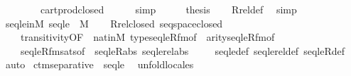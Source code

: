 \begin{isabellebody}
\ \ \ \ \ \ \ \ cartprod{\isacharunderscore}{\kern0pt}closed\isanewline
\ \ \ \ \isamarkupfalse%
\ simp\isanewline
\ \ \isamarkupfalse%
\ \isamarkupfalse%
\ {\isacharquery}{\kern0pt}thesis\isanewline
\ \ \isamarkupfalse%
\ Rrel{\isacharunderscore}{\kern0pt}def\ \isamarkupfalse%
\ simp\isanewline
{}\isamarkupfalse%
%
\endisatagproof
{\isafoldproof}%
%
\isadelimproof
\isanewline
%
\endisadelimproof
\isanewline
{}\isamarkupfalse%
\ seqle{\isacharunderscore}{\kern0pt}in{\isacharunderscore}{\kern0pt}M{\isacharcolon}{\kern0pt}\ {\isachardoublequoteopen}seqle\ {\isasymin}\ M{\isachardoublequoteclose}\isanewline
%
\isadelimproof
\ \ %
\endisadelimproof
%
\isatagproof
{}\isamarkupfalse%
\ Rrel{\isacharunderscore}{\kern0pt}closed\ seqspace{\isacharunderscore}{\kern0pt}closed\ \isanewline
\ \ \ \ transitivity{\isacharbrackleft}{\kern0pt}OF\ {\isacharunderscore}{\kern0pt}\ nat{\isacharunderscore}{\kern0pt}in{\isacharunderscore}{\kern0pt}M{\isacharbrackright}{\kern0pt}\ type{\isacharunderscore}{\kern0pt}seqleR{\isacharunderscore}{\kern0pt}fm{\isacharbrackleft}{\kern0pt}of\ {}{\isacharbrackright}{\kern0pt}\ arity{\isacharunderscore}{\kern0pt}seqleR{\isacharunderscore}{\kern0pt}fm{\isacharbrackleft}{\kern0pt}of\ {}{\isacharbrackright}{\kern0pt}\isanewline
\ \ \ \ seqleR{\isacharunderscore}{\kern0pt}fm{\isacharunderscore}{\kern0pt}sats{\isacharbrackleft}{\kern0pt}of\ {}{\isacharbrackright}{\kern0pt}\ seqleR{\isacharunderscore}{\kern0pt}abs\ seqlerel{\isacharunderscore}{\kern0pt}abs\ \isanewline
\ \ \isamarkupfalse%
\ seqle{\isacharunderscore}{\kern0pt}def\ seqlerel{\isacharunderscore}{\kern0pt}def\ seqleR{\isacharunderscore}{\kern0pt}def\isanewline
\ \ \isamarkupfalse%
\ auto%
\endisatagproof
{\isafoldproof}%
%
\isadelimproof
%
\endisadelimproof
%
\isadelimdocument
%
\endisadelimdocument
%
\isatagdocument
%
\isamarkuptrue%
%
\endisatagdocument
{\isafolddocument}%
%
\isadelimdocument
%
\endisadelimdocument
{}\isamarkupfalse%
\ ctm{\isacharunderscore}{\kern0pt}separative\ {\isachardoublequoteopen}{}{\isacharcircum}{\kern0pt}{\isacharless}{\kern0pt}{\isasymomega}{\isachardoublequoteclose}\ seqle\ {}\isanewline
%
\isadelimproof
%
\endisadelimproof
%
\isatagproof
{}\isamarkupfalse%
\ {\isacharparenleft}{\kern0pt}unfold{\isacharunderscore}{\kern0pt}locales{\isacharparenright}{\kern0pt}\isanewline

\end{isabellebody}

